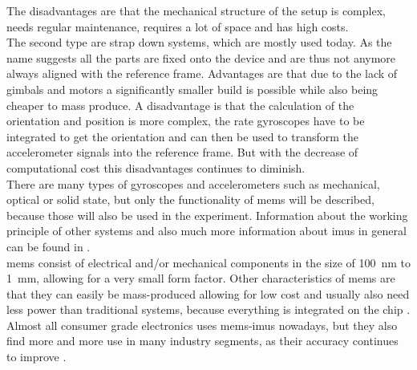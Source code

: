 The disadvantages are that the mechanical structure of the setup is complex, needs regular maintenance, requires a lot of space and has high costs.\\
The second type are strap down systems, which are mostly used today.
As the name suggests all the parts are fixed onto the device and are thus not anymore always aligned with the reference frame.
Advantages are that due to the lack of gimbals and motors a significantly smaller build is possible while also being cheaper to mass produce.
A disadvantage is that the calculation of the orientation and position is more complex, the rate gyroscopes have to be integrated to get the orientation and can then be used to transform the accelerometer signals into the reference frame.
But with the decrease of computational cost this disadvantages continues to diminish.\\
There are many types of gyroscopes and accelerometers such as mechanical, optical or solid state, but only the functionality of \gls{mems} will be described, because those will also be used in the experiment.
Information about the working principle of other systems and also much more information about \glspl{imu} in general can be found in \cite{Woodman2007}.\\
\gls{mems} consist of electrical and/or mechanical components in the size of \SI{100}{\nano\metre} to \SI{1}{\milli\metre}, allowing for a very small form factor.
Other characteristics of \gls{mems} are that they can easily be mass-produced allowing for low cost and usually also need less power than traditional systems, because everything is integrated on the chip \cite{Shaeffer2013}.
Almost all consumer grade electronics uses \gls{mems}-\glspl{imu} nowadays, but they also find more and more use in many industry segments, as their accuracy continues to improve \cite{Perlmutter2016}.

